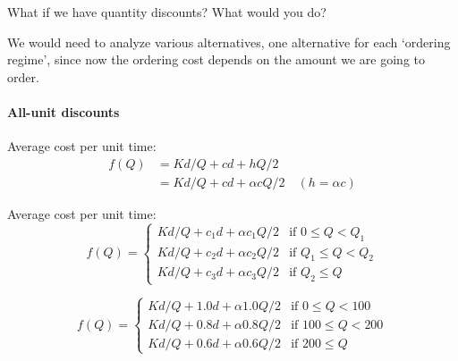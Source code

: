 \begin{question}
  What if we have quantity discounts? What would you do?  
  \begin{solution}
We would need to analyze various alternatives, one alternative for each `ordering regime', since now the ordering cost depends on  the amount we are going to order.

\paragraph{All-unit discounts}

\begin{center}
\end{center}

Average cost per unit time:
\begin{align*}
f(Q) 
& = Kd / Q + cd + hQ/2 \\
& = Kd / Q + cd + \alpha cQ / 2 \quad (h = \alpha c)
\end{align*}

Average cost per unit time:
\begin{equation*}
f(Q) = 
\begin{cases}
Kd / Q + c_1 d + \alpha c_1 Q / 2 & \text{if } 0 \leq Q < Q_1 \\
Kd / Q + c_2 d + \alpha c_2 Q / 2 & \text{if } Q_1 \leq Q < Q_2 \\
Kd / Q + c_3 d + \alpha c_3 Q / 2 & \text{if } Q_2 \leq Q 
\end{cases}
\end{equation*}

\begin{equation*}
f(Q) = 
\begin{cases}
Kd / Q + 1.0 d + \alpha 1.0 Q / 2 & \text{if } 0 \leq Q < 100 \\
Kd / Q + 0.8 d + \alpha 0.8 Q / 2 & \text{if } 100 \leq Q < 200 \\
Kd / Q + 0.6 d + \alpha 0.6 Q / 2 & \text{if } 200 \leq Q 
\end{cases}
\end{equation*}


\end{solution}
\end{question}
